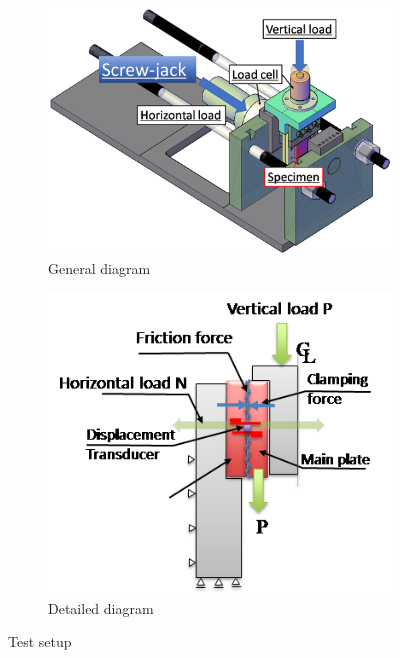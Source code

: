 \begin{figure}
    \centering
    \begin{subfigure}[t]{0.58\textwidth}
    \includegraphics[width=\linewidth]{imgs/ch3/fig6a.png}
    \caption{General diagram}
    \label{ch3fig6a}  
    \end{subfigure}
    \hfill
    \begin{subfigure}[t]{0.38\textwidth}
    \includegraphics[width=\linewidth]{imgs/ch3/fig6b.png}
    \caption{Detailed diagram}
    \label{ch3fig6b}  
    \end{subfigure}
    \caption{Test setup}
    \label{ch3fig6}
\end{figure}

